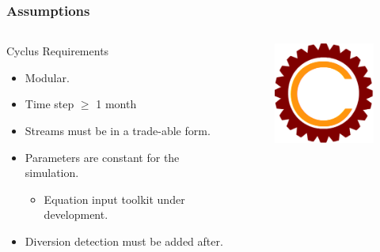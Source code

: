 \begin{frame}
\frametitle{Assumptions}
\begin{columns}
	\begin{column}{.55\textwidth}
		\begin{block}{Cyclus Requirements} 
			\begin{itemize}
				\item Modular.
				\item Time step $\geq$ 1 month
				\item Streams must be in a
				trade-able form.
				\item Parameters are constant for the simulation.
				\begin{itemize}
					\item Equation input toolkit under development.
				\end{itemize}
				\item Diversion detection must be added after.
			\end{itemize}
		\end{block}
	\end{column}
	\begin{column}{.45\textwidth}
		\begin{figure}
			\centering
			\includegraphics[width=0.9\linewidth]{cyclus}
			\label{fig:cyclus}
		\end{figure}
	\end{column}
\end{columns} 
\end{frame}

